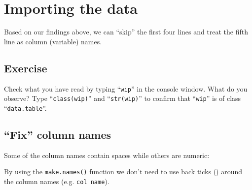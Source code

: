 \documentclass[a4paper,9pt,twocolumn,twoside,printwatermark=true]{pinp}
\begin{document}
\section{Importing the data}\label{importing-the-data}

Based on our findings above, we can ``skip'' the first four lines and
treat the fifth line as column (variable) names.

\begin{Shaded}
\begin{Highlighting}[]
\StringTok{ }\NormalTok{(}\NormalTok{(}\NormalTok{, }\NormalTok{), }
              \NormalTok{, } \NormalTok{)}
\end{Highlighting}
\end{Shaded}

\subsection{Exercise}\label{exercise-1}

Check what you have read by typing ``\texttt{wip}'' in the console
window. What do you observe? Type ``\texttt{class(wip)}'' and
``\texttt{str(wip)}'' to confirm that ``\texttt{wip}'' is of class
``\texttt{data.table}''.

\subsection{\texorpdfstring{``Fix'' column
names}{Fix column names}}\label{fix-column-names}

Some of the column names contain spaces while others are numeric:

\begin{Shaded}
\begin{Highlighting}[]
\NormalTok{(}
\NormalTok{(}
\end{Highlighting}
\end{Shaded}

By using the \texttt{make.names()} function we don't need to use back
ticks (\texttt{\textasciigrave{}}) around the column names (e.g.
\texttt{\textasciigrave{}col\ name\textasciigrave{}}).
\end{document}
